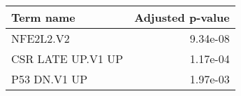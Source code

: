 \begin{tabular}{lr}
\toprule
        Term name &  Adjusted p-value \\
\midrule
        NFE2L2.V2 &          9.34e-08 \\
CSR LATE UP.V1 UP &          1.17e-04 \\
     P53 DN.V1 UP &          1.97e-03 \\
\bottomrule
\end{tabular}
